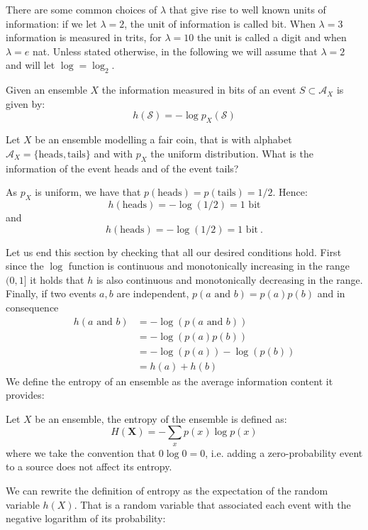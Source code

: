 There are some common choices of $\lambda$ that give rise to well known units of information: if we let $\lambda=2$, the unit of information is called bit. When $\lambda=3$ information is measured in trits, for $\lambda=10$ the unit is called a digit and when $\lambda=e$ nat. Unless stated otherwise, in the following we will assume that $\lambda=2$ and will let $\log=\log_2$.
\begin{definition}
Given an ensemble $X$ the information measured in bits of an event $S\subset \mathcal A_X$ is given by:
\begin{equation}
h(\mathcal S) = -\log p_X(\mathcal S)
\end{equation}
\end{definition}
\begin{exercise}
Let $X$ be an ensemble modelling a fair coin, that is with alphabet $\mathcal A_X=\{\text{heads},\text{tails}\}$ and with $p_X$ the uniform distribution. What is the information of the event heads and of the event tails?
\end{exercise}
\begin{solution}
As $p_X$ is uniform, we have that $p(\text{heads})=p(\text{tails})=1/2$. Hence:
\begin{equation*}
h(\text{heads})=-\log(1/2)=1\text{ bit}
\end{equation*}
and
\begin{equation*}
h(\text{heads})=-\log(1/2)=1\text{ bit}\ .
\end{equation*}
\end{solution}
Let us end this section by checking that all our desired conditions hold. First since the $\log$ function is continuous and monotonically increasing in the range $(0,1]$ it holds that $h$ is also continuous and monotonically decreasing in the range. Finally, if two events $a,b$ are independent, $p(a \text{ and } b)=p(a)p(b)$ and in consequence 
\begin{align}
h(a \text{ and } b) &= -\log \left(p(a \text{ and } b)\right)\\
                    &= -\log \left(p(a) p(b)\right)\\
                    &= -\log(p(a)) -\log(p(b))\\
                    &= h(a)+h(b)
\end{align}
\label{subsec:entropy}
We define the entropy of an ensemble as the average information content it provides:
\begin{definition} Let $X$ be an ensemble, the entropy of the ensemble is defined as: 
        \begin{equation}\label{eq:entr}
        H(\mathbf{X})=-\sum_{x} p(x)\log p(x)   
        \end{equation}
\noindent where we take the convention that $0\log 0=0$, i.e. adding a  zero-probability event to a source does not affect its entropy.
\end{definition}
We can rewrite the definition of entropy as the expectation of the random variable $h(X)$. That is a random variable that associated each event with the negative logarithm of its probability: 

